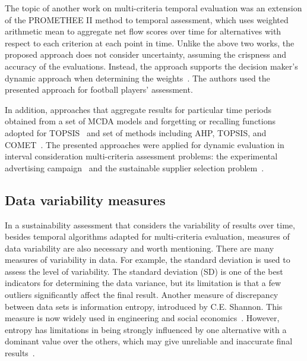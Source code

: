 \documentclass[5p,times]{elsarticle}
\newcounter{example}[section]
\begin{document}
The topic of another work on multi-criteria temporal evaluation was an extension of the PROMETHEE II method to temporal assessment, which uses weighted arithmetic mean to aggregate net flow scores over time for alternatives with respect to each criterion at each point in time. Unlike the above two works, the proposed approach does not consider uncertainty, assuming the crispness and accuracy of the evaluations. Instead, the approach supports the decision maker's dynamic approach when determining the weights~\cite{banamar2018extension}. The authors used the presented approach for football players' assessment.

In addition, approaches that aggregate results for particular time periods obtained from a set of MCDA models and forgetting or recalling functions adopted for TOPSIS~\cite{watrobski2016multistage} and set of methods including AHP, TOPSIS, and COMET~\cite{karczmarczyk2018comparative}. The presented approaches were applied for dynamic evaluation in interval consideration multi-criteria assessment problems: the experimental advertising campaign~\cite{watrobski2016multistage} and the sustainable supplier selection problem~\cite{karczmarczyk2018comparative, kizielewicz2021study}.

\subsection{Data variability measures}
\label{sec:aboutVariabilityMeasurement}
In a sustainability assessment that considers the variability of results over time, besides temporal algorithms adapted for multi-criteria evaluation, measures of data variability are also necessary and worth mentioning. There are many measures of variability in data. For example, the standard deviation is used to assess the level of variability. The standard deviation (SD) is one of the best indicators for determining the data variance, but its limitation is that a few outliers significantly affect the final result. Another measure of discrepancy between data sets is information entropy, introduced by C.E. Shannon. This measure is now widely used in engineering and social economics~\cite{li2020novel}. However, entropy has limitations in being strongly influenced by one alternative with a dominant value over the others, which may give unreliable and inaccurate final results~\cite{zavadskas2016integrated, alao2021selection}.
\end{document}
